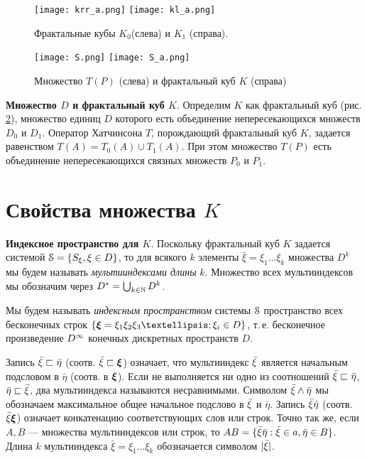 \begin{figure}[H]
\centering
\qquad\qquad
\texttt{[image: krr\_a.png]}
\hfill
\texttt{[image: kl\_a.png]}\qquad\qquad
\caption{Фрактальные кубы $K_0$(слева)  и  $K_1$ (справа).}
\label{fig:5_2}
\end{figure}

\begin{figure}[H]
\centering
\qquad\qquad\texttt{[image: S.png]}
\hfill
\texttt{[image: S\_a.png]}\qquad\qquad
\caption{Множество $T(P)$ (слева)  и фрактальный куб $K$ (справа)}
\label{fig:5_3}
\end{figure}

{\bf Множество $ D$ и фрактальный куб $K$}.  
Определим $K$ как фрактальный куб (рис. \ref{fig:5_3}), множество единиц $D$ которого есть объединение непересекающихся множеств $D_0$  и  $D_1$. 
Оператор Хатчинсона $T$, порождающий фрактальный куб $K$, задается равенством $T(A)=T_0(A)\cup T_1(A)$. 
При этом множество $T(P)$ есть объединение непересекающихся связных множеств $P_0$  и $P_1$.



\section{Свойства множества $K$}

{\bf Индексное пространство для $K$}.
Поскольку фрактальный куб $K$ задается системой ${\EuScript S}=\{S_\xi, \xi\in D\}$, то
для всякого $k$ элементы $\bar\xi=\xi_1\ldots\xi_k$ множества $ D^k$ мы будем называть {\it мультииндексами длины} $k$.
Множество всех мультииндексов мы обозначим через $ D^*=\bigcup_{k\in\mathbb{N}} D^k$.

Мы будем называть {\em индексным пространством} системы ${\EuScript S}$  пространство всех бесконечных строк  $\{\bmx=\xi_1\xi_2\xi_3…;\xi_i\in  D\}$, т.\,е. бесконечное произведение $D^\infty$ конечных дискретных пространств $D$.

Запись ${\bar{\xi}}\sqsubset \bar\eta$ (соотв. ${\bar{\xi}}\sqsubset {\bm{\xi}}$) означает, что мультииндекс ${\bar{\xi}}$ является начальным подсловом в $\bar\eta$ (соотв. в ${\bm{\xi}}$).
Если не выполняется ни одно из соотношений ${\bar{\xi}}\sqsubset \bar\eta$, $ \bar\eta\sqsubset{\bar{\xi}}$, два мультииндекса называются несравнимыми. 
Символом ${\bar{\xi}}\wedge \bar\eta$ мы обозначаем максимальное общее начальное подслово в ${\bar{\xi}}$  и  $\bar\eta$. 
Запись ${\bar{\xi}}\bar\eta$ (соотв. ${\bar{\xi}}{\bm{\xi}}$) означает конкатенацию соответствующих слов или строк. 
Точно так же, если $A,B$ --- множества мультииндексов или строк, то $AB=\{{\bar{\xi}}\bar\eta: {\bar{\xi}}\in a,\bar\eta\in B\}$.   
Длина $k$ мультииндекса $\bar\xi=\xi_1\ldots\xi_k$ обозначается символом $|{\bar{\xi}}|$.

